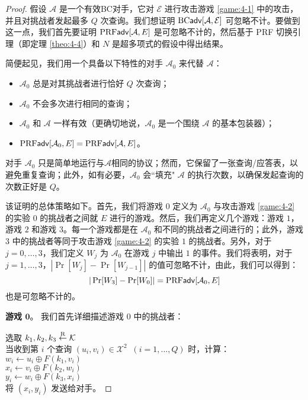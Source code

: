 \begin{proof}
假设 $\mathcal{A}$ 是一个有效BC对手，它对 $\mathcal{E}$ 进行攻击游戏 \ref{game:4-1} 中的攻击，并且对挑战者发起最多 $Q$ 次查询。我们想证明 ${\rm BC\mathsf{adv}}[\mathcal{A},\mathcal{E}]$ 可忽略不计。要做到这一点，我们首先要证明 ${\rm PRF\mathsf{adv}}[\mathcal{A}, E]$ 是可忽略不计的，然后基于 PRF 切换引理（即定理 \ref{theo:4-4}）和 $N$ 是超多项式的假设中得出结果。

简便起见，我们用一个具备以下特性的对手 $\mathcal{A}_0$ 来代替 $\mathcal{A}$：
\begin{itemize}
	\item $\mathcal{A}_0$ 总是对其挑战者进行恰好 $Q$ 次查询；
	\item $\mathcal{A}_0$ 不会多次进行相同的查询；
	\item $\mathcal{A}_0$ 和 $\mathcal{A}$ 一样有效（更确切地说，$\mathcal{A}_0$ 是一个围绕 $\mathcal{A}$ 的基本包装器）；
	\item ${\rm PRF\mathsf{adv}}[\mathcal{A}_0, E]={\rm PRF\mathsf{adv}}[\mathcal{A}, E]$。
\end{itemize}
对手 $\mathcal{A}_0$ 只是简单地运行与$\mathcal{A}$相同的协议；然而，它保留了一张查询/应答表，以避免重复查询；此外，如有必要，$\mathcal{A}_0$ 会``填充" $\mathcal{A}$ 的执行次数，以确保发起查询的次数正好是 $Q$。

该证明的总体策略如下。首先，我们将游戏 $0$ 定义为 $\mathcal{A}_0$ 与攻击游戏 \ref{game:4-2} 的实验 $0$ 的挑战者之间就 $E$ 进行的游戏。然后，我们再定义几个游戏：游戏 $1$，游戏 $2$ 和游戏 $3$。每一个游戏都是在 $\mathcal{A}_0$ 和不同的挑战者之间进行的；此外，游戏 $3$ 中的挑战者等同于攻击游戏 \ref{game:4-2} 的实验 $1$ 的挑战者。另外，对于 $j=0,\dots,3$，我们定义 $W_j$ 为 $\mathcal{A}_0$ 在游戏 $j$ 中输出 $1$ 的事件。我们将表明，对于 $j=1,\dots,3$，$|\Pr[W_j]-\Pr[W_{j-1}]|$ 的值可忽略不计，由此，我们可以得到：
\[
|\Pr[W_3]-\Pr[W_0]|={\rm PRF\mathsf{adv}}[\mathcal{A}_0, E]
\]
也是可忽略不计的。

\vspace{5pt}

\noindent
\textbf{游戏 $\mathbf{0}$}。
我们首先详细描述游戏 $0$ 中的挑战者：

\vspace{5pt}

\hspace*{5pt} 选取 $k_1,k_2,k_3\overset{\rm R}\leftarrow\mathcal{K}$\\
\hspace*{26pt} 当收到第 $i$ 个查询 $(u_i,v_i)\in\mathcal{X}^2\;\;(i=1,\dots,Q)$ 时，计算：\\
\hspace*{50pt} $w_i\leftarrow u_i\oplus F(k_1,v_i)$\\
\hspace*{50pt} $x_i\leftarrow v_i\oplus F(k_2,w_i)$\\
\hspace*{50pt} $y_i\leftarrow w_i\oplus F(k_3,x_i)$\\
\hspace*{50pt} 将 $(x_i,y_i)$ 发送给对手。


\end{proof}

